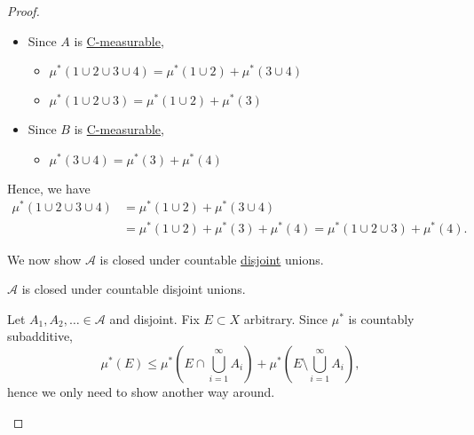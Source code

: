 \begin{proof}
\begin{enumerate}[(1)]
\begin{itemize}
\begin{explanation}
				            \begin{itemize}
					            \item Since \(A\) is \hyperref[def:C-measurable]{C-measurable},
					                  \begin{itemize}
						                  \item \(\mu^{\ast} (1\cup 2\cup 3\cup 4) = \mu^{\ast} (1\cup 2) + \mu^{\ast} (3\cup 4)\)
						                  \item \(\mu^{\ast} (1\cup 2\cup 3) = \mu^{\ast} (1\cup 2) + \mu^{\ast} (3)\)
					                  \end{itemize}
					            \item Since \(B\) is \hyperref[def:C-measurable]{C-measurable},
					                  \begin{itemize}
						                  \item \(\mu^{\ast} (3\cup 4) = \mu^{\ast} (3) + \mu^{\ast} (4)\)
					                  \end{itemize}
				            \end{itemize}
				            Hence, we have
				            \[
					            \begin{split}
						            \mu^{\ast} (1\cup 2\cup 3\cup 4) &= \mu^{\ast} (1\cup 2)+\mu^{\ast} (3\cup 4)\\
						            &= \mu^{\ast} (1\cup 2) + \mu^{\ast} (3) + \mu^{\ast} (4)
						            = \mu^{\ast}(1\cup 2\cup 3) + \mu^{\ast} (4).
					            \end{split}
				            \]
			            \end{explanation}
			            We now show \(\mathcal{A} \) is closed under countable \underline{disjoint} unions.
			            \begin{claim}
				            \(\mathcal{A} \) is closed under countable disjoint unions.
			            \end{claim}
			            \begin{explanation}
				            Let \(A_1, A_2, \ldots \in\mathcal{A}\) and disjoint.
				            Fix \(E\subset X\) arbitrary. Since \(\mu^{\ast} \) is countably subadditive,
				            \[
					            \mu^{\ast} (E) \leq  \mu^{\ast} \left(E\cap \bigcup\limits_{i=1}^{\infty} A_{i}\right) + \mu^{\ast} \left(E\setminus \bigcup\limits_{i=1}^{\infty} A_{i}\right),
				            \]
				            hence we only need to show another way around.


\end{explanation}
\end{itemize}
\end{enumerate}
\end{proof}
